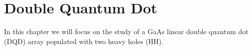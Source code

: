 
\chapter{Double Quantum Dot} %

\label{sec:DQD} %


In this chapter we will focus on the study of a GaAs linear double quantum dot (DQD) array populated with two heavy holes (HH). 

